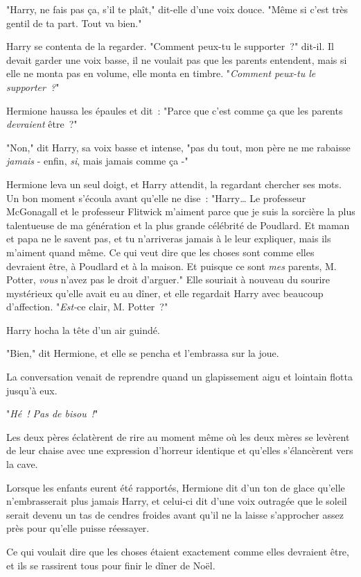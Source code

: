 "Harry, ne fais pas ça, s'il te plaît," dit-elle d'une voix douce. "Même si c'est très gentil de ta part. Tout va bien."

Harry se contenta de la regarder. "Comment peux-tu le supporter~?" dit-il. Il devait garder une voix basse, il ne voulait pas que les parents entendent, mais si elle ne monta pas en volume, elle monta en timbre. "\emph{Comment peux-tu le supporter~?}"

Hermione haussa les épaules et dit~: "Parce que c'est comme ça que les parents \emph{devraient} être~?"

"Non," dit Harry, sa voix basse et intense, "pas du tout, mon père ne me rabaisse \emph{jamais} - enfin, \emph{si}, mais jamais comme ça -"

Hermione leva un seul doigt, et Harry attendit, la regardant chercher ses mots. Un bon moment s'écoula avant qu'elle ne dise~: "Harry… Le professeur McGonagall et le professeur Flitwick m'aiment parce que je suis la sorcière la plus talentueuse de ma génération et la plus grande célébrité de Poudlard. Et maman et papa ne le savent pas, et tu n'arriveras jamais à le leur expliquer, mais ils m'aiment quand même. Ce qui veut dire que les choses sont comme elles devraient être, à Poudlard et à la maison. Et puisque ce sont \emph{mes} parents, M. Potter, \emph{vous} n'avez pas le droit d'arguer." Elle souriait à nouveau du sourire mystérieux qu'elle avait eu au dîner, et elle regardait Harry avec beaucoup d'affection. "\emph{Est-}ce clair, M. Potter~?"

Harry hocha la tête d'un air guindé.

"Bien," dit Hermione, et elle se pencha et l'embrassa sur la joue.

\later

La conversation venait de reprendre quand un glapissement aigu et lointain flotta jusqu'à eux.

"\emph{Hé~! Pas de bisou~!}"

Les deux pères éclatèrent de rire au moment même où les deux mères se levèrent de leur chaise avec une expression d'horreur identique et qu'elles s'élancèrent vers la cave.

Lorsque les enfants eurent été rapportés, Hermione dit d'un ton de glace qu'elle n'embrasserait plus jamais Harry, et celui-ci dit d'une voix outragée que le soleil serait devenu un tas de cendres froides avant qu'il ne la laisse s'approcher assez près pour qu'elle puisse réessayer.

Ce qui voulait dire que les choses étaient exactement comme elles devraient être, et ils se rassirent tous pour finir le dîner de Noël.

